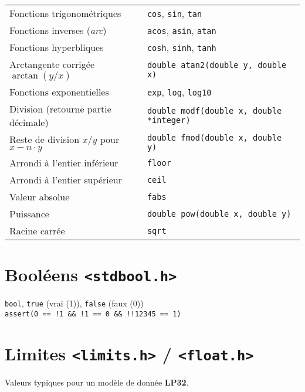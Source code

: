 \documentclass{article}
\newcommand{\cd}{\lstinline}
\begin{document}
\begin{multicols*}{3}
\begin{tabularx}{\linewidth}{Xl}
  Fonctions trigonométriques & \cd{cos}, \cd{sin}, \cd{tan} \\
  Fonctions inverses (\emph{arc}) & \cd{acos}, \cd{asin}, \cd{atan} \\
  Fonctions hyperbliques & \cd{cosh}, \cd{sinh}, \cd{tanh} \\
  Arctangente corrigée $\arctan(y / x)$ & \cd{double atan2(double y, double x)} \\
  Fonctions exponentielles & \cd{exp}, \cd{log}, \cd{log10} \\
  Division (retourne partie décimale) & \cd{double modf(double x, double *integer)} \\
  Reste de division $x/y$ pour $x - n \cdot y$ & \cd{double fmod(double x, double y)} \\
  Arrondi à l'entier inférieur & \cd{floor} \\
  Arrondi à l'entier supérieur & \cd{ceil} \\
  Valeur absolue & \cd{fabs} \\
  Puissance & \cd{double pow(double x, double y)} \\
  Racine carrée & \cd{sqrt} \\
\end{tabularx}

\section*{Booléens \texttt{<stdbool.h>}}

\cd{bool}, \cd{true} (vrai (1)), \cd{false} (faux (0)) \\
\cd{assert(0 == !1 && !1 == 0 && !!12345 == 1)}

\section*{Limites \texttt{<limits.h>} / \texttt{<float.h>}}

Valeurs typiques pour un modèle de donnée \textbf{LP32}.


\end{multicols*}
\end{document}
